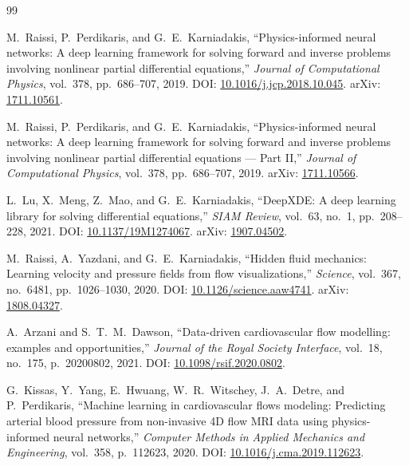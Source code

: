 \documentclass[12pt,a4paper]{article}
\begin{document}


\begin{thebibliography}{99}

M.~Raissi, P.~Perdikaris, and G.~E.~Karniadakis,
``Physics-informed neural networks: A deep learning framework for
solving forward and inverse problems involving nonlinear partial
differential equations,''
\textit{Journal of Computational Physics}, vol.~378,
pp.~686--707, 2019.
DOI: \href{https://doi.org/10.1016/j.jcp.2018.10.045}{10.1016/j.jcp.2018.10.045}.
arXiv: \href{https://arxiv.org/abs/1711.10561}{1711.10561}.

M.~Raissi, P.~Perdikaris, and G.~E.~Karniadakis,
``Physics-informed neural networks: A deep learning framework for
solving forward and inverse problems involving nonlinear partial
differential equations --- Part II,''
\textit{Journal of Computational Physics}, vol.~378,
pp.~686--707, 2019.
arXiv: \href{https://arxiv.org/abs/1711.10566}{1711.10566}.

L.~Lu, X.~Meng, Z.~Mao, and G.~E.~Karniadakis,
``{DeepXDE}: A deep learning library for solving differential
equations,''
\textit{SIAM Review}, vol.~63, no.~1, pp.~208--228, 2021.
DOI: \href{https://doi.org/10.1137/19M1274067}{10.1137/19M1274067}.
arXiv: \href{https://arxiv.org/abs/1907.04502}{1907.04502}.

M.~Raissi, A.~Yazdani, and G.~E.~Karniadakis,
``Hidden fluid mechanics: Learning velocity and pressure fields
from flow visualizations,''
\textit{Science}, vol.~367, no.~6481, pp.~1026--1030, 2020.
DOI: \href{https://doi.org/10.1126/science.aaw4741}{10.1126/science.aaw4741}.
arXiv: \href{https://arxiv.org/abs/1808.04327}{1808.04327}.

A.~Arzani and S.~T.~M.~Dawson,
``Data-driven cardiovascular flow modelling: examples and
opportunities,''
\textit{Journal of the Royal Society Interface},
vol.~18, no.~175, p.~20200802, 2021.
DOI: \href{https://doi.org/10.1098/rsif.2020.0802}{10.1098/rsif.2020.0802}.

G.~Kissas, Y.~Yang, E.~Hwuang, W.~R.~Witschey,
J.~A.~Detre, and P.~Perdikaris,
``Machine learning in cardiovascular flows modeling: Predicting
arterial blood pressure from non-invasive 4D flow MRI data using
physics-informed neural networks,''
\textit{Computer Methods in Applied Mechanics and Engineering},
vol.~358, p.~112623, 2020.
DOI: \href{https://doi.org/10.1016/j.cma.2019.112623}{10.1016/j.cma.2019.112623}.


\end{thebibliography}
\end{document}
